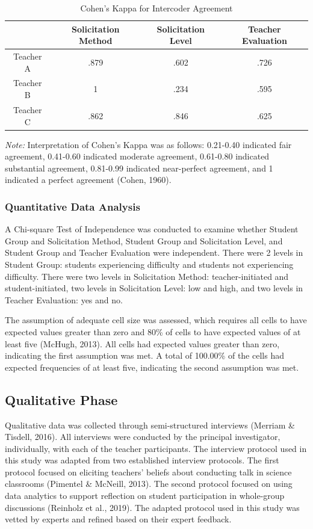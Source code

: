 \documentclass{sig-alternate} %
\begin{document}
\begin{large}
\begin{table}[htp]
\caption{Cohen’s Kappa for Intercoder Agreement}
\begin{tabular}{cccc}
\hline
& Solicitation Method & Solicitation Level & Teacher Evaluation \\ \hline
Teacher A & .879 & .602 & .726 \\
Teacher B & 1 & .234 & .595 \\
Teacher C & .862 & .846 & .625 \\ \hline
\end{tabular}
\textit{Note:} Interpretation of Cohen’s Kappa was as follows: 0.21-0.40 indicated fair agreement, 0.41-0.60 indicated moderate agreement, 0.61-0.80 indicated substantial agreement, 0.81-0.99 indicated near-perfect agreement, and 1 indicated a perfect agreement (Cohen, 1960).
\end{table}

\subsubsection*{Quantitative Data Analysis}
A Chi-square Test of Independence was conducted to examine whether Student Group and Solicitation Method, Student Group and Solicitation Level, and Student Group and Teacher Evaluation were independent. There were 2 levels in Student Group: students experiencing difficulty and students not experiencing difficulty. There were two levels in Solicitation Method: teacher-initiated and student-initiated, two levels in Solicitation Level: low and high, and two levels in Teacher Evaluation: yes and no. 

The assumption of adequate cell size was assessed, which requires all cells to have expected values greater than zero and 80\% of cells to have expected values of at least five (McHugh, 2013). All cells had expected values greater than zero, indicating the first assumption was met. A total of 100.00\% of the cells had expected frequencies of at least five, indicating the second assumption was met.

\subsection*{Qualitative Phase}
Qualitative data was collected through semi-structured interviews (Merriam \& Tisdell, 2016). All interviews were conducted by the principal investigator, individually, with each of the teacher participants. The interview protocol used in this study was adapted from two established interview protocols. The first protocol focused on eliciting teachers’ beliefs about conducting talk in science classrooms (Pimentel \& McNeill, 2013). The second protocol focused on using data analytics to support reflection on student participation in whole-group discussions (Reinholz et al., 2019). The adapted protocol used in this study was vetted by experts and refined based on their expert feedback. 


\end{large}
\end{document}
